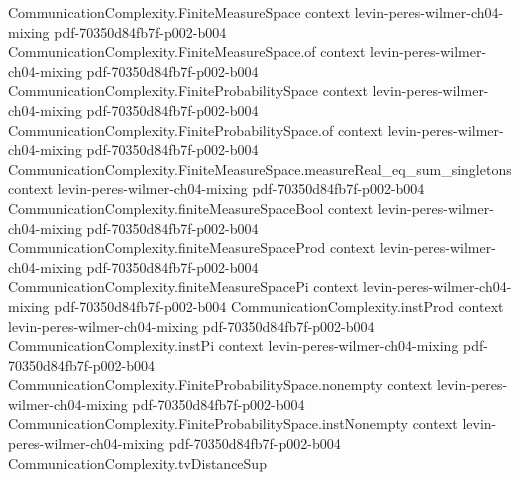 \begin{theorem}
\label{CommunicationComplexity.TVDistance.tvDistanceSup_eq_half_sum}
\leanok
{}
\proofstep
  {CommunicationComplexity.FiniteMeasureSpace}
  {context}
  {levin-peres-wilmer-ch04-mixing}
  {pdf-70350d84fb7f-p002-b004}
\proofstep
  {CommunicationComplexity.FiniteMeasureSpace.of}
  {context}
  {levin-peres-wilmer-ch04-mixing}
  {pdf-70350d84fb7f-p002-b004}
\proofstep
  {CommunicationComplexity.FiniteProbabilitySpace}
  {context}
  {levin-peres-wilmer-ch04-mixing}
  {pdf-70350d84fb7f-p002-b004}
\proofstep
  {CommunicationComplexity.FiniteProbabilitySpace.of}
  {context}
  {levin-peres-wilmer-ch04-mixing}
  {pdf-70350d84fb7f-p002-b004}
\proofstep
  {CommunicationComplexity.FiniteMeasureSpace.measureReal_eq_sum_singletons}
  {context}
  {levin-peres-wilmer-ch04-mixing}
  {pdf-70350d84fb7f-p002-b004}
\proofstep
  {CommunicationComplexity.finiteMeasureSpaceBool}
  {context}
  {levin-peres-wilmer-ch04-mixing}
  {pdf-70350d84fb7f-p002-b004}
\proofstep
  {CommunicationComplexity.finiteMeasureSpaceProd}
  {context}
  {levin-peres-wilmer-ch04-mixing}
  {pdf-70350d84fb7f-p002-b004}
\proofstep
  {CommunicationComplexity.finiteMeasureSpacePi}
  {context}
  {levin-peres-wilmer-ch04-mixing}
  {pdf-70350d84fb7f-p002-b004}
\proofstep
  {CommunicationComplexity.instProd}
  {context}
  {levin-peres-wilmer-ch04-mixing}
  {pdf-70350d84fb7f-p002-b004}
\proofstep
  {CommunicationComplexity.instPi}
  {context}
  {levin-peres-wilmer-ch04-mixing}
  {pdf-70350d84fb7f-p002-b004}
\proofstep
  {CommunicationComplexity.FiniteProbabilitySpace.nonempty}
  {context}
  {levin-peres-wilmer-ch04-mixing}
  {pdf-70350d84fb7f-p002-b004}
\proofstep
  {CommunicationComplexity.FiniteProbabilitySpace.instNonempty}
  {context}
  {levin-peres-wilmer-ch04-mixing}
  {pdf-70350d84fb7f-p002-b004}
\proofstep
  {CommunicationComplexity.tvDistanceSup}

\end{theorem}
